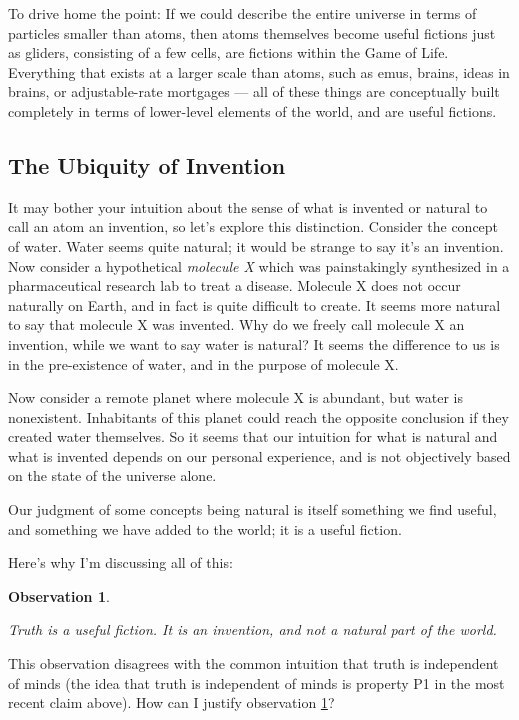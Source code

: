 \documentclass[11pt, oneside]{article}
\newtheorem{obs}{Observation}
\theoremstyle{argtstyle}
\begin{document}
To drive home the point: If we could describe the entire universe in terms
of particles smaller than atoms, then atoms themselves become useful fictions
just as gliders, consisting of a few cells, are fictions within the Game of Life.
Everything that exists at a larger scale than atoms, such as emus, brains, ideas in
brains, or adjustable-rate mortgages --- all of these things are conceptually
built completely in terms of lower-level elements of the world, and are useful
fictions.

\subsection{The Ubiquity of Invention}

It may bother your intuition about the sense of what is invented or natural
to call an atom an invention, so let's explore this distinction.
Consider the concept of water.
Water seems quite natural;
it would be strange to say it's an invention.
Now consider a hypothetical {\em molecule X} which was painstakingly synthesized
in a pharmaceutical research lab to treat a disease.
Molecule X does not occur naturally on Earth,
and in fact is quite difficult to create. It seems more natural to say that
molecule X was invented.
Why do we freely call molecule X an invention, while we want to say
water is natural?
It seems the difference to us is in the pre-existence of water, and
in the purpose of molecule X.

Now consider a remote planet where molecule X is abundant, but water is
nonexistent. Inhabitants of this planet could reach the opposite conclusion if
they created water themselves. So it seems that our intuition for what is
natural and what is invented depends on our personal experience, and is
not objectively based on the state of the universe alone.

Our judgment of some concepts being natural is itself something
we find useful, and something we have added to the world; it is a useful
fiction.

Here's why I'm discussing all of this:
\newcommand{\obsthree}{
    Truth is a useful fiction. It is an invention, and not a natural part of the
    world.
}
\begin{obs}\label{o3}
    \obsthree
\end{obs}

This observation disagrees with the common intuition that truth is
independent of minds (the idea that truth is independent of minds is
property P1 in the most recent claim above).
How can I justify observation \ref{o3}?
\end{document}
